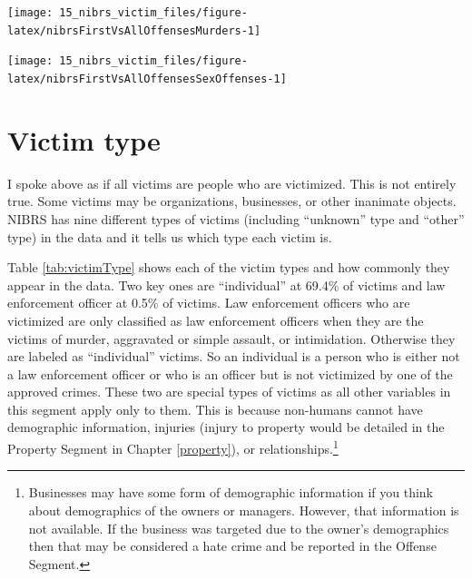 \documentclass[
]{krantz}
\let\origfigure\figure
\let\endorigfigure\endfigure
\renewenvironment{figure}[1][2] {
    \expandafter\origfigure\expandafter[H]
} {
    \endorigfigure
}
\begin{document}
\begin{figure}

{\centering \texttt{[image: 15\_nibrs\_victim\_files/figure-latex/nibrsFirstVsAllOffensesMurders-1]} 

}

\caption{The numbers of murders when considering only the first offense or all offenses, 1991-2022.}\label{fig:nibrsFirstVsAllOffensesMurders}
\end{figure}

\begin{figure}

{\centering \texttt{[image: 15\_nibrs\_victim\_files/figure-latex/nibrsFirstVsAllOffensesSexOffenses-1]} 

}

\caption{The numbers of sexual offenders when considering only the first offense or all offenses, 1991-2022.}\label{fig:nibrsFirstVsAllOffensesSexOffenses}
\end{figure}

\section{Victim type}\label{victim-type}

I spoke above as if all victims are people who are
victimized. This is not entirely true. Some victims may be
organizations, businesses, or other inanimate objects. NIBRS
has nine different types of victims (including ``unknown''
type and ``other'' type) in the data and it tells us which
type each victim is.

Table \ref{tab:victimType} shows each of the victim types
and how commonly they appear in the data. Two key ones are
``individual'' at 69.4\% of victims and law enforcement
officer at 0.5\% of victims. Law enforcement officers who
are victimized are only classified as law enforcement
officers when they are the victims of murder, aggravated or
simple assault, or intimidation. Otherwise they are labeled
as ``individual'' victims. So an individual is a person who
is either not a law enforcement officer or who is an officer
but is not victimized by one of the approved crimes. These
two are special types of victims as all other variables in
this segment apply only to them. This is because non-humans
cannot have demographic information, injuries (injury to
property would be detailed in the Property Segment in
Chapter \ref{property}), or relationships.\footnote{Businesses
  may have some form of demographic information if you think
  about demographics of the owners or managers. However,
  that information is not available. If the business was
  targeted due to the owner's demographics then that may be
  considered a hate crime and be reported in the Offense
  Segment.}
\end{document}

